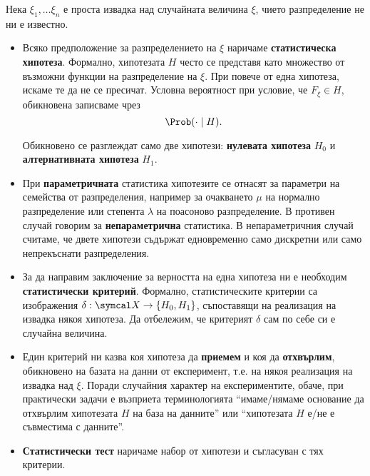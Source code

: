 \documentclass[
  headings=standardclasses,
  bibliography=totocnumbered,
]{scrartcl}
\begin{document}
\begin{definition}[Хипотези]
  Нека \( \xi_1, \ldots \xi_n \) е проста извадка над случайната величина \( \xi \), чието разпределение не ни е известно.

  \begin{itemize}
    \item Всяко предположение за разпределението на \( \xi \) наричаме \textbf{статистическа хипотеза}. Формално, хипотезата \( H \) често се представя като множество от възможни функции на разпределение на \( \xi \). При повече от една хипотеза, искаме те да не се пресичат. Условна вероятност при условие, че \( F_\xi \in H \), обикновена записваме чрез
    \begin{equation*}
      \Prob(\cdot \mid H).
    \end{equation*}

    Обикновено се разглеждат само две хипотези: \textbf{нулевата хипотеза} \( H_0 \) и \textbf{алтернативната хипотеза} \( H_1 \).

    \item При \textbf{параметричната} статистика хипотезите се отнасят за параметри на семейства от разпределения, например за очакването \( \mu \) на нормално разпределение или степента \( \lambda \) на поасоново разпределение. В противен случай говорим за \textbf{непараметрична} статистика. В непараметричния случай считаме, че двете хипотези съдържат едновременно само дискретни или само непрекъснати разпределения.

    \item За да направим заключение за верността на една хипотеза ни е необходим \textbf{статистически критерий}. Формално, статистическите критерии са изображения \( \delta: \SampleSpace \to \{ H_0, H_1 \} \), съпоставящи на реализация на извадка някоя хипотеза. Да отбележим, че критерият \( \delta \) сам по себе си е случайна величина.

    \item Един критерий ни казва коя хипотеза да \textbf{приемем} и коя да \textbf{отхвърлим}, обикновено на базата на данни от експеримент, т.е. на някоя реализация на извадка над \( \xi \). Поради случайния характер на експериментите, обаче, при практически задачи е възприета терминологията \enquote{имаме/нямаме основание да отхвърлим хипотезата \( H \) на база на данните} или \enquote{хипотезата \( H \) е/не е съвместима с данните}.

    \item \textbf{Статистически тест} наричаме набор от хипотези и съгласуван с тях критерии.


\end{itemize}
\end{definition}
\end{document}
